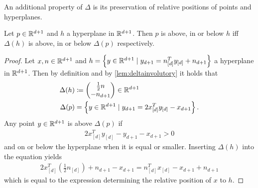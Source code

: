 An additional property of $\Delta$ is its preservation of relative positions of points and hyperplanes.
\begin{lemma}
    \label{lem:relativepositions}
    Let $p \in \mathbb{R}^{d+1}$ and $h$ a hyperplane in $\mathbb{R}^{d+1}$.
    Then $p$ is above, in or below $h$ iff $\Delta(h)$ is above, in or below $\Delta(p)$ respectively.
\end{lemma}
\begin{proof}
    Let $x,n \in \mathbb{R}^{d+1}$ and $h = \left\{ y \in \mathbb{R}^{d+1} \mid y_{d+1} = n_{[d]}^Ty_{[d]} + n_{d+1} \right\}$ a hyperplane in $\mathbb{R}^{d+1}$.
    Then by definition and by \cref{lem:deltainvolutory} it holds that
    \begin{align}
        \Delta(h) &\coloneqq \begin{pmatrix} \frac{1}{2} n \\ -n_{d+1} \end{pmatrix}  \in \mathbb{R}^{d+1}\\
        \Delta(p) &= \left\{ y \in \mathbb{R}^{d+1} \mid y_{d+1} = 2x_{[d]}^Ty_{[d]} - x_{d+1} \right\}.
    \end{align}
    Any point $y \in \mathbb{R}^{d+1}$ is above $\Delta(p)$ if
    \begin{align}
        2x_{[d]}^Ty_{[d]} - y_{d+1} - x_{d+1} > 0
    \end{align}
    and on or below the hyperplane when it is equal or smaller.
    Inserting $\Delta(h)$ into the equation yields
    \begin{align}
        2x_{[d]}^T \left( \frac{1}{2}n_{[d]} \right) + n_{d+1} - x_{d+1} = n_{[d]}^Tx_{[d]} - x_{d+1} + n_{d+1}
    \end{align}
    which is equal to the expression determining the relative position of $x$ to $h$.
\end{proof}

